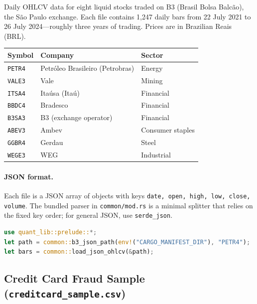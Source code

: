 Daily OHLCV data for eight liquid stocks traded on B3 (Brasil Bolsa
Balcão), the S\~ao Paulo exchange. Each file contains 1{,}247 daily
bars from 22 July 2021 to 26 July 2024---roughly three years of
trading. Prices are in Brazilian Reais (BRL).

\begin{center}
\begin{tabular}{lll}
\toprule
\textbf{Symbol} & \textbf{Company} & \textbf{Sector} \\
\midrule
\texttt{PETR4} & Petr\'oleo Brasileiro (Petrobras) & Energy \\
\texttt{VALE3} & Vale & Mining \\
\texttt{ITSA4} & Ita\'usa (Ita\'u) & Financial \\
\texttt{BBDC4} & Bradesco & Financial \\
\texttt{B3SA3} & B3 (exchange operator) & Financial \\
\texttt{ABEV3} & Ambev & Consumer staples \\
\texttt{GGBR4} & Gerdau & Steel \\
\texttt{WEGE3} & WEG & Industrial \\
\bottomrule
\end{tabular}
\end{center}


\paragraph{JSON format.}
Each file is a JSON array of objects with keys
\texttt{date, open, high, low, close, volume}. The bundled parser
in \texttt{common/mod.rs} is a minimal splitter that relies on the
fixed key order; for general JSON, use \texttt{serde\_json}.

\begin{lstlisting}[language=Rust]
use quant_lib::prelude::*;
let path = common::b3_json_path(env!("CARGO_MANIFEST_DIR"), "PETR4");
let bars = common::load_json_ohlcv(&path);
\end{lstlisting}

\subsection{Credit Card Fraud Sample (\texttt{creditcard\_sample.csv})}


